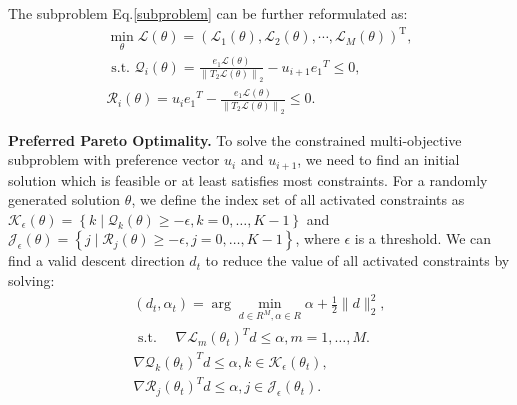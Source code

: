 \documentclass[final]{cvpr}
\begin{document}
The subproblem Eq.\ref{subproblem} can be further reformulated as:
\begin{equation} \begin{array}{c} \min _{\theta} \mathcal{L}(\theta)=\left(\mathcal{L}_{1}(\theta), \mathcal{L}_{2}(\theta), \cdots, \mathcal{L}_{M}(\theta)\right)^{\mathrm{T}}, \\  \text { s.t. }  \mathcal{Q}_i(\theta) = \frac{e_1 \mathcal{L}(\theta)}{\left \| T_2 \mathcal{L}(\theta) \right \|_2  } - u_{i+1} {e_1}^T \leq 0, \\
\mathcal{R}_i(\theta) = u_i {e_1}^T - \frac{e_1 \mathcal{L}(\theta)}{\left \| T_2 \mathcal{L}(\theta) \right \|_2  } \leq 0.  
 \end{array} \end{equation}  

 

\textbf{Preferred Pareto Optimality.}
To solve the constrained multi-objective subproblem with preference vector $u_i$ and $u_{i+1}$, we need to find an initial solution which is feasible or at least satisfies most constraints.
For a randomly generated solution $\theta$, we define the index set of all activated constraints as $\mathcal{K}_\epsilon(\theta) = \left\{k \mid \mathcal{Q}_k\left(\theta\right) \geq -\epsilon, k=0,\ldots, K-1\right\}$ and  $\mathcal{J}_\epsilon(\theta) = \left\{j \mid \mathcal{R}_j\left(\theta\right) \geq -\epsilon, j=0,\ldots, K-1\right\}$, where $\epsilon$ is a threshold.
We can find a valid descent direction $d_t$ to reduce the value of all activated constraints by solving:
\begin{equation}\label{eqNewP} 	
\begin{array}{c} \left(d_{t}, \alpha_{t}\right)=\arg \min _{d \in R^{M}, \alpha \in R} \alpha+\frac{1}{2}\|d\|^{2}_2, \\ 
\text { s.t. } \quad \nabla \mathcal{L}_{m}\left(\theta_{t}\right)^{T} d \leq \alpha, m=1, \ldots, M. \\
\nabla \mathcal{Q}_k(\theta_t)^{T} d \leq \alpha, k \in \mathcal{K}_\epsilon(\theta_{t}), \\ 
\nabla \mathcal{R}_j(\theta_t)^{T} d \leq \alpha, j \in \mathcal{J}_\epsilon(\theta_{t}).
\end{array} \end{equation}
\end{document}
